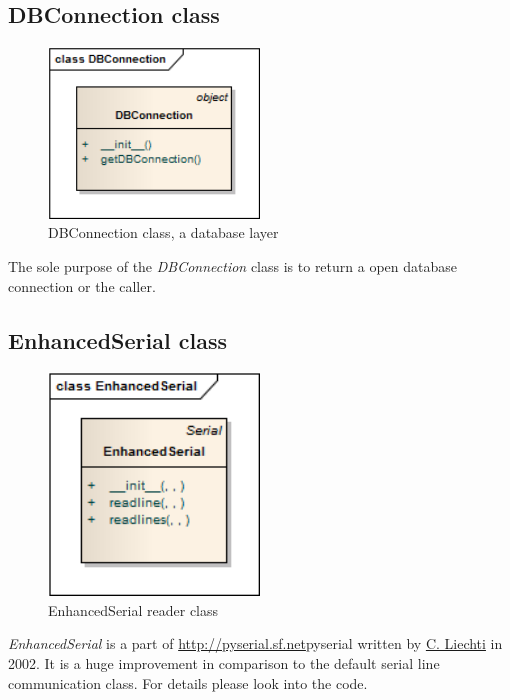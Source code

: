 \newpage
\subsection{DBConnection class}
\begin{figure}[H]
   \centering
   \includegraphics[width=0.5\textwidth]{pic/DBConnection.png}%
   \caption{DBConnection class, a database layer}
   \label{DBConnectionpic}%
\end{figure}

The sole purpose of the \textit{DBConnection} class is to return a open database connection or the caller. 

\newpage
\subsection{EnhancedSerial class}
\begin{figure}[H]
   \centering
   \includegraphics[width=0.5\textwidth]{pic/EnhancedSerial.png}%
   \caption{EnhancedSerial reader class}
   \label{EnhancedSerialpic}%
\end{figure}

\textit{EnhancedSerial} is a part of \url{http://pyserial.sf.net}{pyserial}  written by \href{mailto:cliechti@gmx.net}{C. Liechti} in 2002.
It is a huge improvement in comparison to the default serial line communication class. For details please look into the code.


